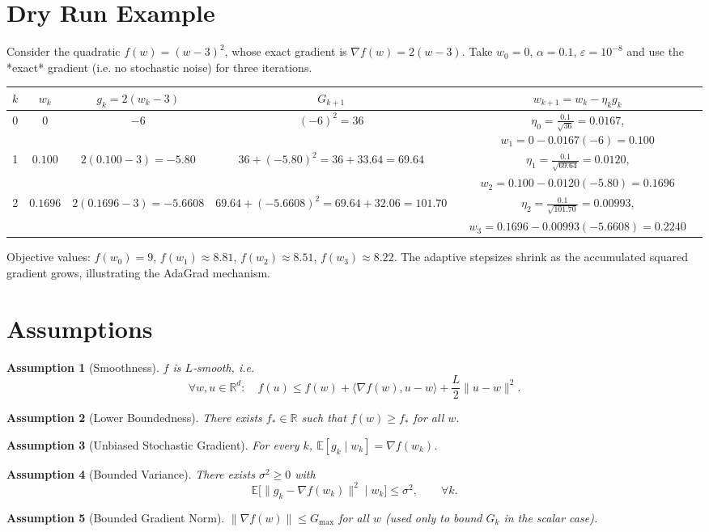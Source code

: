 \documentclass{article}
\newtheorem{assumption}{Assumption}
\newcommand{\E}{\mathbb{E}}
\begin{document}
\section*{Dry Run Example}
Consider the quadratic $f(w)=(w-3)^2$, whose exact gradient is $\nabla f(w)=2(w-3)$.  
Take $w_0=0$, $\alpha=0.1$, $\varepsilon=10^{-8}$ and use the *exact* gradient (i.e. no stochastic noise) for three iterations.

\begin{center}
\begin{tabular}{c|c|c|c|c}
$k$ & $w_k$ & $g_k=2(w_k-3)$ & $G_{k+1}$ & $w_{k+1}=w_k-\eta_k g_k$\\\hline
0 & $0$ & $-6$ & $(-6)^2=36$ & $\displaystyle \eta_0=\frac{0.1}{\sqrt{36}}=0.0167$, $w_1=0-0.0167(-6)=0.100$\\[4pt]
1 & $0.100$ & $2(0.100-3)=-5.80$ & $36+(-5.80)^2=36+33.64=69.64$ &
$\displaystyle \eta_1=\frac{0.1}{\sqrt{69.64}}=0.0120$,\\
 &  &  &  & $w_2=0.100-0.0120(-5.80)=0.1696$\\[4pt]
2 & $0.1696$ & $2(0.1696-3)=-5.6608$ &
$69.64+(-5.6608)^2=69.64+32.06=101.70$ &
$\displaystyle \eta_2=\frac{0.1}{\sqrt{101.70}}=0.00993$,\\
 &  &  &  & $w_3=0.1696-0.00993(-5.6608)=0.2240$
\end{tabular}
\end{center}

Objective values: $f(w_0)=9$, $f(w_1)\approx8.81$, $f(w_2)\approx8.51$, $f(w_3)\approx8.22$.  
The adaptive stepsizes shrink as the accumulated squared gradient grows, illustrating the AdaGrad mechanism.

\newpage
\section*{Assumptions}
\begin{assumption}[Smoothness]\label{ass:smooth}
$f$ is $L$‑smooth, i.e.
\[
\forall w,u\in\mathbb{R}^{d}:\quad 
f(u)\le f(w)+\langle\nabla f(w),u-w\rangle+\frac{L}{2}\|u-w\|^{2}.
\]
\end{assumption}
\begin{assumption}[Lower Boundedness]\label{ass:lb}
There exists $f_* \in \mathbb{R}$ such that $f(w)\ge f_*$ for all $w$.
\end{assumption}
\begin{assumption}[Unbiased Stochastic Gradient]\label{ass:unbiased}
For every $k$, $\E[g_k\mid w_k]=\nabla f(w_k)$.
\end{assumption}
\begin{assumption}[Bounded Variance]\label{ass:variance}
There exists $\sigma^{2}\ge0$ with
\[
\E\bigl[\|g_k-\nabla f(w_k)\|^{2}\mid w_k\bigr]\le\sigma^{2},\qquad\forall k .
\]
\end{assumption}
\begin{assumption}[Bounded Gradient Norm]\label{ass:bound}
$\|\nabla f(w)\|\le G_{\max}$ for all $w$ (used only to bound $G_k$ in the scalar case).
\end{assumption}
\end{document}
